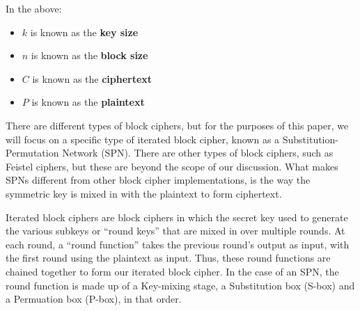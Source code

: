 \begin{rem}
In the above:
\begin{itemize}
\item $k$ is known as the \textbf{key size}
\item $n$ is known as the \textbf{block size}
\item $C$ is known as the \textbf{ciphertext}
\item $P$ is known as the \textbf{plaintext}
\end{itemize}
\end{rem}

There are different types of block ciphers, but for the purposes of this paper,
we will focus on a specific type of iterated block cipher, known as a
Substitution-Permutation Network (SPN). There are other types of block ciphers,
such as Feistel ciphers, but these are beyond the scope of our discussion.
What makes SPNs different from other block cipher implementations, is the way 
the symmetric key is mixed in with the plaintext to form ciphertext. 

Iterated block ciphers are block ciphers in which the secret key used to
generate the various subkeys or ``round keys'' that are mixed in over multiple
rounds. At each round, a ``round function'' takes the previous round's output
as input, with the first round using the plaintext as input. Thus, these round
functions are chained together to form our iterated block cipher. In the case
of an SPN, the round function is made up of a Key-mixing stage, a Substitution box (S-box)
and a Permuation box (P-box), in that order.

